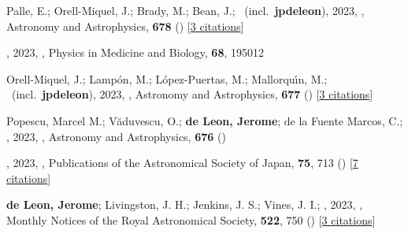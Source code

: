 \item[{\color{numcolor}\scriptsize185}] Palle, E.; Orell-Miquel, J.; Brady, M.; Bean, J.; \etal\ (incl.\ \textbf{jpdeleon}), 2023, , Astronomy and Astrophysics, \textbf{678} () [\href{https://ui.adsabs.harvard.edu/abs/2023A&A...678A..80P}{3 citations}]

\item[{\color{numcolor}\scriptsize184}] , 2023, , Physics in Medicine and Biology, \textbf{68}, 195012

\item[{\color{numcolor}\scriptsize183}] Orell-Miquel, J.; Lamp{\'o}n, M.; L{\'o}pez-Puertas, M.; Mallorqu{\'\i}n, M.; \etal\ (incl.\ \textbf{jpdeleon}), 2023, , Astronomy and Astrophysics, \textbf{677} () [\href{https://ui.adsabs.harvard.edu/abs/2023A&A...677A..56O}{3 citations}]

\item[{\color{numcolor}\scriptsize182}] Popescu, Marcel M.; V{\u{a}}duvescu, O.; \textbf{de Leon, Jerome}; de la Fuente Marcos, C.; \etal, 2023, , Astronomy and Astrophysics, \textbf{676} ()

\item[{\color{numcolor}\scriptsize181}] , 2023, , Publications of the Astronomical Society of Japan, \textbf{75}, 713 () [\href{https://ui.adsabs.harvard.edu/abs/2023PASJ...75..713K}{7 citations}]

\item[{\color{numcolor}\scriptsize180}] \textbf{de Leon, Jerome}; Livingston, J. H.; Jenkins, J. S.; Vines, J. I.; \etal, 2023, , Monthly Notices of the Royal Astronomical Society, \textbf{522}, 750 () [\href{https://ui.adsabs.harvard.edu/abs/2023MNRAS.522..750D}{3 citations}]

